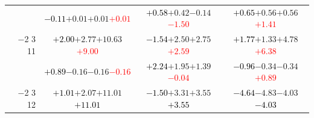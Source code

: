 \documentclass[compress]{beamer}
\begin{document}
\begin{frame}
\begin{tabular}{r | c | c | c}
          & \textcolor{black}{$-0.11$}\hspace{0.1 cm}$+0.01$\hspace{0.1 cm}$+0.01$\hspace{0.1 cm}\textcolor{red}{$+0.01$} & \textcolor{black}{$+0.58$}\hspace{0.1 cm}$+0.42$\hspace{0.1 cm}$-0.14$\hspace{0.1 cm}\textcolor{red}{$-1.50$} & \textcolor{black}{$+0.65$}\hspace{0.1 cm}$+0.56$\hspace{0.1 cm}$+0.56$\hspace{0.1 cm}\textcolor{red}{$+1.41$} \\
$-$2 3 11 & \textcolor{black}{$+2.00$}\hspace{0.1 cm}$+2.77$\hspace{0.1 cm}$+10.63$\hspace{0.1 cm}\textcolor{red}{$+9.00$} & \textcolor{black}{$-1.54$}\hspace{0.1 cm}$+2.50$\hspace{0.1 cm}$+2.75$\hspace{0.1 cm}\textcolor{red}{$+2.59$} & \textcolor{black}{$+1.77$}\hspace{0.1 cm}$+1.33$\hspace{0.1 cm}$+4.78$\hspace{0.1 cm}\textcolor{red}{$+6.38$} \\
          & \textcolor{black}{$+0.89$}\hspace{0.1 cm}$-0.16$\hspace{0.1 cm}$-0.16$\hspace{0.1 cm}\textcolor{red}{$-0.16$} & \textcolor{black}{$+2.24$}\hspace{0.1 cm}$+1.95$\hspace{0.1 cm}$+1.39$\hspace{0.1 cm}\textcolor{red}{$-0.04$} & \textcolor{black}{$-0.96$}\hspace{0.1 cm}$-0.34$\hspace{0.1 cm}$-0.34$\hspace{0.1 cm}\textcolor{red}{$+0.89$} \\
$-$2 3 12 & \textcolor{black}{$+1.01$}\hspace{0.1 cm}$+2.07$\hspace{0.1 cm}$+11.01$\hspace{0.1 cm}\textcolor{black}{$+11.01$} & \textcolor{black}{$-1.50$}\hspace{0.1 cm}$+3.31$\hspace{0.1 cm}$+3.55$\hspace{0.1 cm}\textcolor{black}{$+3.55$} & \textcolor{black}{$-4.64$}\hspace{0.1 cm}$-4.83$\hspace{0.1 cm}$-4.03$\hspace{0.1 cm}\textcolor{black}{$-4.03$} \\

\end{tabular}
\end{frame}
\end{document}

